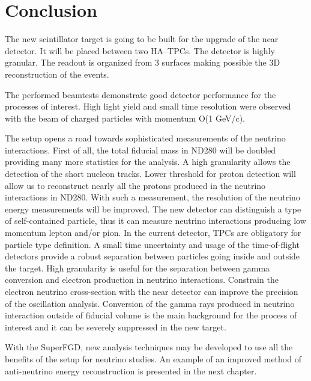 \documentclass[main.tex]{subfiles}
\begin{document}
\section{Conclusion}
The new scintillator target is going to be built for the upgrade of the near detector. It will be placed between two HA--TPCs. The detector is highly granular. The readout is organized from 3 surfaces making possible the 3D reconstruction of the events.

The performed beamtests demonstrate good detector performance for the processes of interest. High light yield and small time resolution were observed with the beam of charged particles with momentum O(1 GeV/c).

The setup opens a road towards sophisticated measurements of the neutrino interactions. First of all, the total fiducial mass in ND280 will be doubled providing many more statistics for the analysis. A high granularity allows the detection of the short nucleon tracks. Lower threshold for proton detection will allow us to reconstruct nearly all the protons produced in the neutrino interactions in ND280. With such a measurement, the resolution of the neutrino energy measurements will be improved. The new detector can distinguish a type of self-contained particle, thus it can measure neutrino interactions producing low momentum lepton and/or pion. In the current detector, TPCs are obligatory for particle type definition. A small time uncertainty and usage of the time-of-flight detectors provide a robust separation between particles going inside and outside the target. High granularity is useful for the separation between gamma conversion and electron production in neutrino interactions. Constrain the electron neutrino cross-section with the near detector can improve the precision of the oscillation analysis. Conversion of the gamma rays produced in neutrino interaction outside of fiducial volume is the main background for the process of interest and it can be severely suppressed in the new target.

With the SuperFGD, new analysis techniques may be developed to use all the benefits of the setup for neutrino studies. An example of an improved method of anti-neutrino energy reconstruction is presented in the next chapter.
\end{document}
